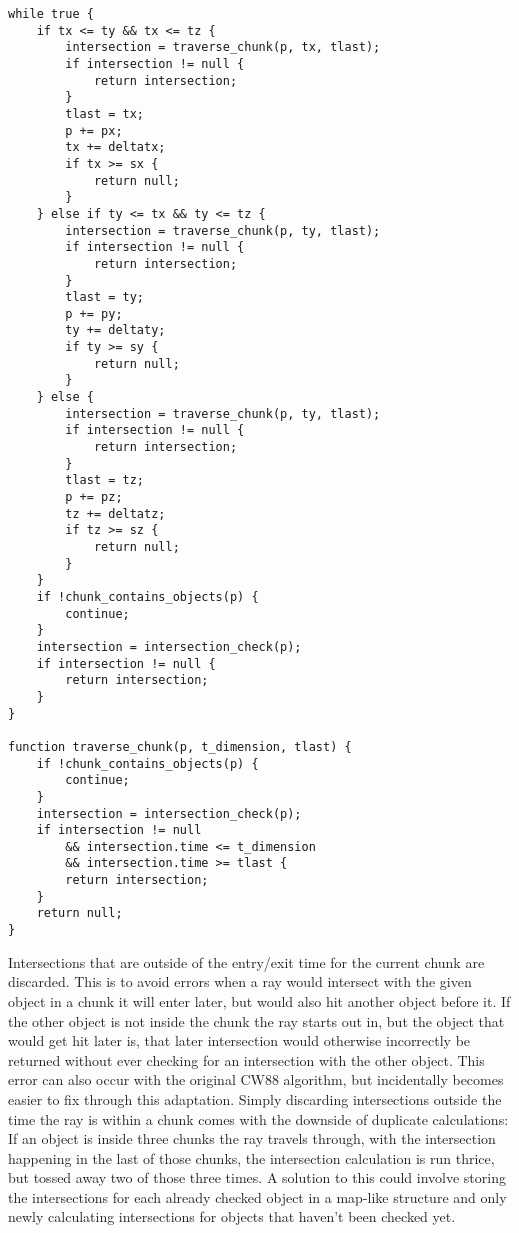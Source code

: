 \begin{verbatim}
while true {
	if tx <= ty && tx <= tz {
        intersection = traverse_chunk(p, tx, tlast);
        if intersection != null {
            return intersection;
        }
        tlast = tx;
		p += px;
		tx += deltatx;
		if tx >= sx {
            return null;
        }
	} else if ty <= tx && ty <= tz {
        intersection = traverse_chunk(p, ty, tlast);
        if intersection != null {
            return intersection;
        }
        tlast = ty;
		p += py;
		ty += deltaty;
		if ty >= sy {
            return null;
        }
	} else {
        intersection = traverse_chunk(p, ty, tlast);
        if intersection != null {
            return intersection;
        }
        tlast = tz;
		p += pz;
		tz += deltatz;
		if tz >= sz {
            return null;
        }
	}
    if !chunk_contains_objects(p) {
        continue;
    }
    intersection = intersection_check(p);
    if intersection != null {
        return intersection;
    }
}

function traverse_chunk(p, t_dimension, tlast) {
    if !chunk_contains_objects(p) {
        continue;
    }
    intersection = intersection_check(p);
    if intersection != null 
        && intersection.time <= t_dimension
        && intersection.time >= tlast {
        return intersection;
    }
    return null;
}
\end{verbatim}

Intersections that are outside of the entry/exit time for the current chunk are discarded.
This is to avoid errors when a ray would intersect with the given object in a chunk it will enter later,
but would also hit another object before it.
If the other object is not inside the chunk the ray starts out in,
but the object that would get hit later is,
that later intersection would otherwise incorrectly be returned without ever checking for an intersection with the other object.
This error can also occur with the original CW88 algorithm,
but incidentally becomes easier to fix through this adaptation.
\newline
Simply discarding intersections outside the time the ray is within a chunk comes with the downside of duplicate calculations:
If an object is inside three chunks the ray travels through, with the intersection happening in the last of those chunks,
the intersection calculation is run thrice, but tossed away two of those three times.
\newline
A solution to this could involve storing the intersections for each already checked object in a map-like structure
and only newly calculating intersections for objects that haven't been checked yet.
